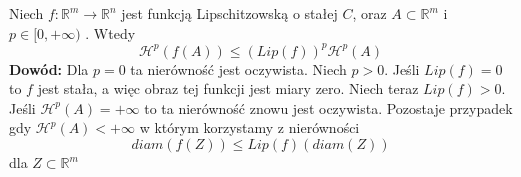 \begin{lem}
	Niech $f: \mathbb{R}^m \rightarrow \mathbb{R}^n$ jest funkcją Lipschitzowską o stałej $C$, oraz $A \subset \mathbb{R}^m$ i $p \in [0, + \infty)$ . Wtedy $$
		\mathcal{H}^p(f(A)) \leq (Lip(f))^p \mathcal{H}^p(A)
	$$
	\textbf{Dowód:}\newline
	Dla $p=0$ ta nierówność jest oczywista. Niech $p>0$. Jeśli $Lip(f) = 0$ to $f$ jest stała, a więc obraz tej funkcji jest miary zero. Niech teraz $Lip(f)>0$. Jeśli $\mathcal{H}^p(A) = +\infty$ to ta nierówność znowu jest oczywista. Pozostaje przypadek gdy $\mathcal{H}^p(A) < +\infty$ w którym korzystamy z nierówności $$
		diam(f(Z)) \leq Lip(f)(diam(Z))
	$$
	dla $Z \subset \mathbb{R}^m$ 
\end{lem}